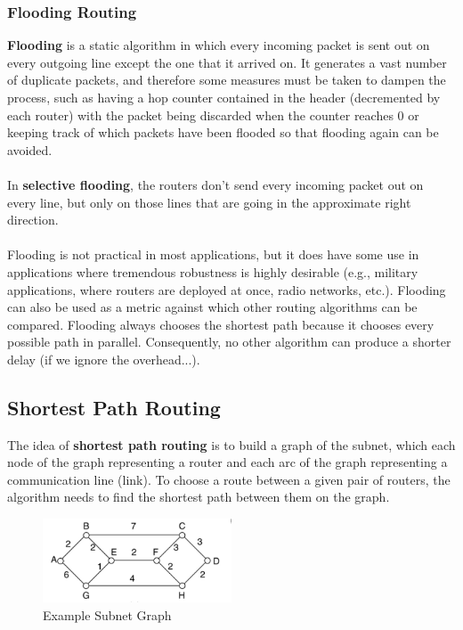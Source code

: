 \documentclass[a4paper,11pt]{article}
\begin{document}
\subsubsection{Flooding Routing}
\textbf{Flooding} is a static algorithm in which every incoming packet is sent out on every outgoing line 
except the one that it arrived on. 
It generates a vast number of duplicate packets, and therefore some measures must be taken to dampen the process,
such as having a hop counter contained in the header (decremented by each router) with the packet being discarded
when the counter reaches 0 or keeping track of which packets have been flooded so that flooding again can be 
avoided.
\\\\ 
In \textbf{selective flooding}, the routers don't send every incoming packet out on every line, but only on those 
lines that are going in the approximate right direction.
\\\\
Flooding is not practical in most applications, but it does have some use in applications where tremendous 
robustness is highly desirable (e.g., military applications, where routers are deployed at once, radio networks, 
etc.). 
Flooding can also be used as a metric against which other routing algorithms can be compared.
Flooding always chooses the shortest path because it chooses every possible path in parallel.
Consequently, no other algorithm can produce a shorter delay (if we ignore the overhead...).

\subsection{Shortest Path Routing}
The idea of \textbf{shortest path routing} is to build a graph of the subnet, which each node of the graph
representing a router and each arc of the graph representing a communication line (link).
To choose a route between a given pair of routers, the algorithm needs to find the shortest path between them on 
the graph.
\begin{figure}[H]
    \centering
    \includegraphics[width=0.5\textwidth]{./images/example_subnet_graph.png}
    \caption{Example Subnet Graph}
\end{figure}
\end{document}
